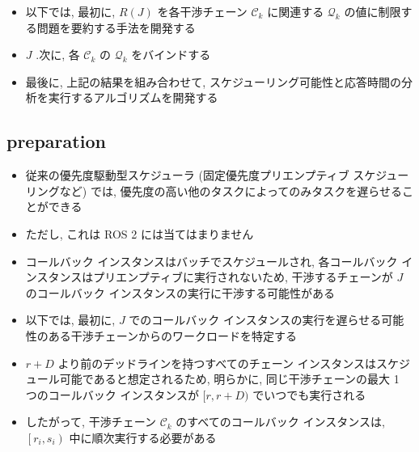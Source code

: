 \begin{frame}{}
    \begin{itemize}
        \item 以下では, 最初に, $R(J)$ を各干渉チェーン $\mathcal{C}_{k}$ に関連する $\mathcal{Q}_{k}$ の値に制限する問題を要約する手法を開発する
        \item $J$ .次に, 各 $\mathcal{C}_{k}$ の $\mathcal{Q}_{k}$ をバインドする
        \item 最後に, 上記の結果を組み合わせて, スケジューリング可能性と応答時間の分析を実行するアルゴリズムを開発する
    \end{itemize}
\end{frame}


\subsection{preparation}
\label{ssec: preparation}

\begin{frame}{}
    \begin{itemize}
        \item 従来の優先度駆動型スケジューラ (固定優先度プリエンプティブ スケジューリングなど) では, 優先度の高い他のタスクによってのみタスクを遅らせることができる
        \item ただし, これは ROS 2 には当てはまりません
        \item コールバック インスタンスはバッチでスケジュールされ, 各コールバック インスタンスはプリエンプティブに実行されないため, 干渉するチェーンが $J$ のコールバック インスタンスの実行に干渉する可能性がある
        \item 以下では, 最初に, $J$ でのコールバック インスタンスの実行を遅らせる可能性のある干渉チェーンからのワークロードを特定する
    \end{itemize}
\end{frame}

\begin{frame}{}
    \begin{itemize}
        \item  $r+D$ より前のデッドラインを持つすべてのチェーン インスタンスはスケジュール可能であると想定されるため, 明らかに, 同じ干渉チェーンの最大 1 つのコールバック インスタンスが $[r, r+D)$ でいつでも実行される
        \item したがって, 干渉チェーン $\mathcal{C}_{k}$ のすべてのコールバック インスタンスは, $\left[r_{i}, s_{i}\right)$ 中に順次実行する必要がある
    \end{itemize}
\end{frame}

